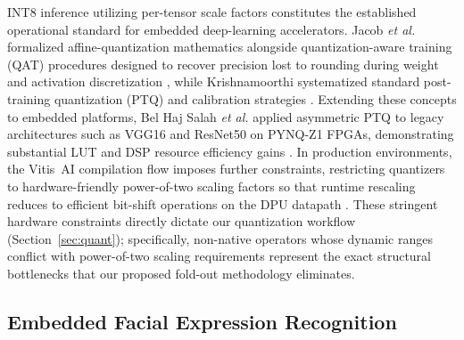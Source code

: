 \documentclass[algorithms,article,submit,moreauthors]{Definitions/mdpi}
\begin{document}
INT8 inference utilizing per-tensor scale factors constitutes the established operational standard for embedded deep-learning accelerators. Jacob \textit{et al.} formalized affine-quantization mathematics alongside quantization-aware training (QAT) procedures designed to recover precision lost to rounding during weight and activation discretization \citep{bib9}, while Krishnamoorthi systematized standard post-training quantization (PTQ) and calibration strategies \citep{bib10}. Extending these concepts to embedded platforms, Bel Haj Salah \textit{et al.} applied asymmetric PTQ to legacy architectures such as VGG16 and ResNet50 on PYNQ-Z1 FPGAs, demonstrating substantial LUT and DSP resource efficiency gains \citep{bib11}. In production environments, the Vitis~AI compilation flow imposes further constraints, restricting quantizers to hardware-friendly power-of-two scaling factors so that runtime rescaling reduces to efficient bit-shift operations on the DPU datapath \citep{bib1}. These stringent hardware constraints directly dictate our quantization workflow (Section~\ref{sec:quant}); specifically, non-native operators whose dynamic ranges conflict with power-of-two scaling requirements represent the exact structural bottlenecks that our proposed fold-out methodology eliminates.

\subsection{Embedded Facial Expression Recognition}
\end{document}
